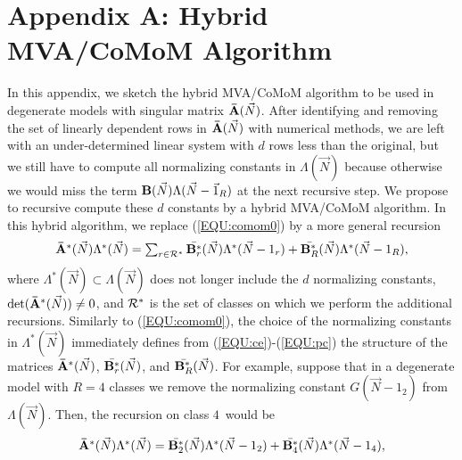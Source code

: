 \documentclass[journal,twocolumn,9.5pt]{IEEEtran}
\newcommand{\comom}[1]{\bar{#1}}
\begin{document}
\section*{\sc Appendix A: Hybrid MVA/CoMoM Algorithm}
In this appendix, we sketch the hybrid MVA/CoMoM algorithm to be used in degenerate models with singular matrix ${\bf \comom{A}}(\vec N)$.
After identifying and removing the set of linearly dependent rows in ${\bf \comom{A}}(\vec N)$ with numerical methods, we are left with an under-determined linear system with $d$ rows less than the original, but we still have to compute all normalizing constants in $\Lambda(\vec N)$ because otherwise we would miss the term ${\bf B}(\vec N)\Lambda(\vec N-\vec 1_R)$ at the next recursive step. We propose to recursive compute these $d$ constants by a hybrid MVA/CoMoM algorithm. In this hybrid algorithm, we replace (\ref{EQU:comom0}) by a more general recursion
\[
\textstyle {\bf \comom{A}^\ast}(\vec N){\Lambda^\ast}(\vec N)=\sum_{r\in {\cal R}^\ast} \comom{{\bf B}_r^\ast}(\vec N){\Lambda^\ast}(\vec N-1_r)+\comom{{\bf B}_R^\ast}(\vec N){\Lambda^\ast}(\vec N-1_R),
\]
where ${\Lambda^\ast}(\vec N)\subset {\Lambda}(\vec N)$ does not longer include the $d$ normalizing constants, $\det({\bf \comom{A}^\ast}(\vec N))\neq 0$, and ${\cal R}^\ast$ is the set of classes on which we perform the additional recursions. Similarly to (\ref{EQU:comom0}), the choice of the normalizing constants in ${\Lambda^\ast}(\vec N)$ immediately defines from (\ref{EQU:ce})-(\ref{EQU:pc}) the structure of the matrices ${\bf \comom{A}^\ast}(\vec N)$, $\comom{{\bf B}_r^\ast}(\vec N)$, and $\comom{{\bf B}_R^\ast}(\vec N)$. For example, suppose that in a degenerate model with $R=4$ classes we remove the normalizing constant $G(\vec N-1_2)$ from ${\Lambda}(\vec N)$. Then, the recursion on class $4$~would be
\begin{equation}
\textstyle {\bf \comom{A}^\ast}(\vec N){\Lambda^\ast}(\vec N)=\comom{{\bf B}^\ast_2}(\vec N){\Lambda^\ast}(\vec N-1_2)+\comom{{\bf B}^\ast_4}(\vec N){\Lambda^\ast}(\vec N-1_4),\nonumber
\end{equation}
\end{document}
